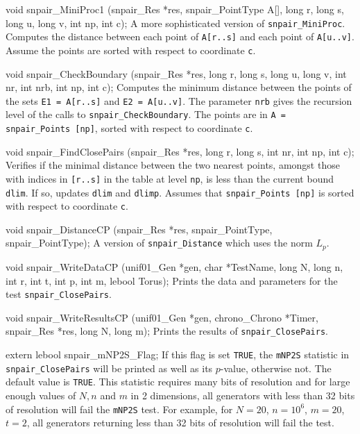 void snpair_MiniProc1 (snpair_Res *res, snpair_PointType A[], long r, long s,
                       long u, long v, int np, int c);
\endcode
 \tab A more sophisticated version of {\tt snpair\_MiniProc}. 
 Computes the distance between each point of {\tt A[r..s]} and each point
  of {\tt A[u..v]}. Assume the points are sorted with respect to
  coordinate {\tt c}.
\endtab
\code


void snpair_CheckBoundary (snpair_Res *res, long r, long s, long u, long v,
                           int nr, int nrb, int np, int c);
\endcode
 \tab  Computes the minimum distance between the  points of the sets
   {\tt E1 = A[r..s]} and {\tt E2 = A[u..v]}.
   The parameter {\tt nrb} gives the recursion level of the calls
   to {\tt snpair\_CheckBoundary}.
   The  points are in {\tt A = snpair\_Points [np]}, sorted with respect to
   coordinate {\tt c}.
 \endtab
\code


void snpair_FindClosePairs (snpair_Res *res, long r, long s, int nr,
                            int np, int c);
\endcode
 \tab Verifies if the minimal distance between the two nearest points,
   amongst those with indices in {\tt [r..s]} in the table at level
   {\tt np}, is less than the current bound {\tt dlim}. If so,
   updates {\tt dlim} and {\tt dlimp}.  
   Assumes that {\tt snpair\_Points [np]} is sorted with respect to
   coordinate {\tt c}.
 \endtab
\endhide


\ifdetailed
{} %
\else                          %

\resdef
\fi  %

\hide %
\code

void snpair_DistanceCP (snpair_Res *res, snpair_PointType, snpair_PointType);
\endcode
 \tab A version of {\tt snpair\_Distance} which uses the norm $L_p$.
 \endtab
\endhide %
\ifdetailed %
\code


void snpair_WriteDataCP (unif01_Gen *gen, char *TestName, long N, long n,
                         int r, int t, int p, int m, lebool Torus);
\endcode
 \tab Prints the data and parameters for the test {\tt snpair\_ClosePairs}.
 \endtab
\code


void snpair_WriteResultsCP (unif01_Gen *gen, chrono_Chrono *Timer,
                            snpair_Res *res, long N, long m);
\endcode
 \tab Prints the results of {\tt snpair\_ClosePairs}.
 \endtab
\fi %
\code


extern lebool snpair_mNP2S_Flag;
\endcode
 \tab If this flag is set {\tt TRUE}, the {\tt mNP2S} statistic in 
 {\tt snpair\_ClosePairs} will be printed as well as its $p$-value, otherwise not.
  The default value is {\tt TRUE}.
 This statistic requires many bits of resolution and for large enough values of
  $N, n$ and $m$ in 2 dimensions, all generators with less than 32 bits of 
  resolution will fail the {\tt mNP2S} test.
  For example, for $N=20$, $n=10^6$, $m=20$, $t=2$, all generators returning
  less than 32  bits of resolution will fail the test. \endtab
\code


